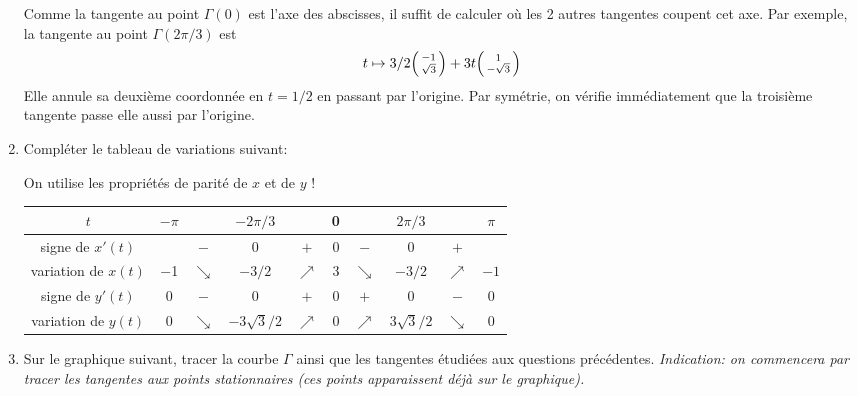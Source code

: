 \documentclass[a4paper]{tp_um}
\begin{document}
\begin{enumerate}
Comme la tangente au point $\Gamma(0)$ est l'axe des abscisses, il suffit de calculer où les 2 autres tangentes coupent cet axe. Par exemple, la tangente au point $\Gamma(2\pi/3)$ est 
\[
	t \mapsto 3/2  \begin{psmallmatrix}
		-1 \\  \sqrt{3}
	\end{psmallmatrix} + 3 t \begin{psmallmatrix}
		1 \\ -\sqrt{3}
	\end{psmallmatrix}		
\]
Elle annule sa deuxième coordonnée en $t=1/2$ en passant par l'origine. Par symétrie, on vérifie immédiatement que la troisième tangente passe elle aussi par l'origine. 
\bigskip

		\item Compléter le tableau de variations suivant:
			\bigskip

			On utilise les propriétés de parité de $x$ et de $y$ !
			\begin{center}
				\begin{tabular}{|c|ccccccccc|}
					\hline    $t$       & $-\pi$ & \hspace{1.5cm}  & $-2\pi/3$ & \hspace{1.5cm}  &  0	& \hspace{1.5cm} & $2\pi/3$ & \hspace{1.5cm}   & $\pi$\\[0.3cm]\hline\hline
					signe de $x'(t)$     &     &  $-$ & 0 & $+$  & 0 & $-$ & 0 &  $+$           &	\\[0.4cm]\hline
					variation de $x(t)$ &  $-$1   & $\searrow$    & $-3/2$ & $\nearrow$ & 3 & $\searrow$  & $-3/2$ &     $\nearrow$      & $-1$	\\[0.9cm]\hline\hline
					signe de $y'(t)$   & 0 & $-$    & 0        &$+$ &0 & $+$& 0 & $-$&      0	\\[0.4cm]\hline
					variation de $y(t)$ &   0  &  $\searrow$        & $-3\sqrt{3}/2 $ &  $\nearrow$& 0 &  $\nearrow$&  $3\sqrt{3}/2 $&   $\searrow$  &	0\\[0.9cm]\hline
				\end{tabular}
			\end{center}
		\item  Sur le graphique suivant, tracer la courbe $\Gamma$ ainsi que les tangentes étudiées aux questions précédentes. {\it Indication: on commencera par tracer les tangentes aux points stationnaires (ces points apparaissent déjà sur le graphique).}
				\begin{center}


\end{center}
\end{enumerate}
\end{document}
